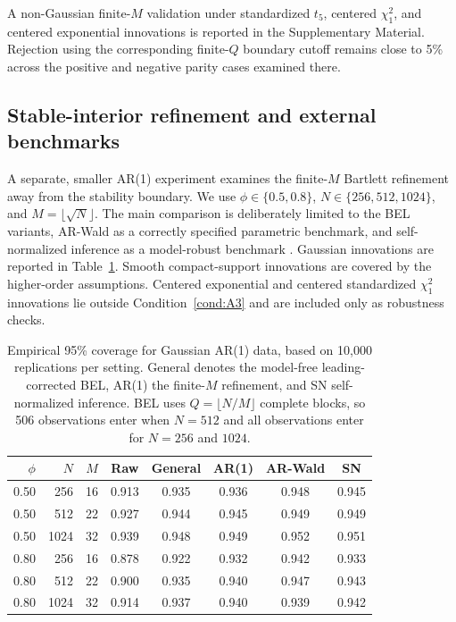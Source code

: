 \documentclass[12pt]{article}
\theoremstyle{remark}
\begin{document}
A non-Gaussian finite-$M$ validation under standardized $t_5$, centered $\chi_1^2$, and centered exponential innovations is reported in the Supplementary Material. Rejection using the corresponding finite-$Q$ boundary cutoff remains close to 5\% across the positive and negative parity cases examined there.

\subsection{Stable-interior refinement and external benchmarks}
A separate, smaller AR(1) experiment examines the finite-$M$ Bartlett refinement away from the stability boundary. We use $\phi\in\{0.5,0.8\}$, $N\in\{256,512,1024\}$, and $M=\lfloor\sqrt N\rfloor$. The main comparison is deliberately limited to the BEL variants, AR-Wald as a correctly specified parametric benchmark, and self-normalized inference as a model-robust benchmark \citep{Shao:2010,Shao:2010corr}. Gaussian innovations are reported in Table~\ref{tab:correct-ar1-gaussian}. Smooth compact-support innovations are covered by the higher-order assumptions. Centered exponential and centered standardized $\chi_1^2$ innovations lie outside Condition~\ref{cond:A3} and are included only as robustness checks.

\begin{table}[htbp]
\centering
\caption{Empirical 95\% coverage for Gaussian AR(1) data, based on 10,000 replications per setting. General denotes the model-free leading-corrected BEL, AR(1) the finite-$M$ refinement, and SN self-normalized inference. BEL uses $Q=\lfloor N/M\rfloor$ complete blocks, so 506 observations enter when $N=512$ and all observations enter for $N=256$ and $1024$.}
\label{tab:correct-ar1-gaussian}
\small
\begin{tabular}{rrrccccc}
\toprule
$\phi$ & $N$ & $M$ & Raw & General & AR(1) & AR-Wald & SN \\
\midrule
0.50 & 256 & 16 & 0.913 & 0.935 & 0.936 & 0.948 & 0.945 \\
0.50 & 512 & 22 & 0.927 & 0.944 & 0.945 & 0.949 & 0.949 \\
0.50 & 1024 & 32 & 0.939 & 0.948 & 0.949 & 0.952 & 0.951 \\
0.80 & 256 & 16 & 0.878 & 0.922 & 0.932 & 0.942 & 0.933 \\
0.80 & 512 & 22 & 0.900 & 0.935 & 0.940 & 0.947 & 0.943 \\
0.80 & 1024 & 32 & 0.914 & 0.937 & 0.940 & 0.939 & 0.942 \\
\bottomrule
\end{tabular}
\end{table}
\end{document}
